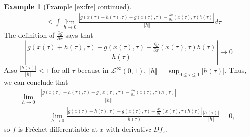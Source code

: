 \documentclass[12pt,reqno]{amsart}
\theoremstyle{definition}
\newtheorem*{example*}{Example}
\newcommand{\norm}[1]{\left\Vert {#1} \right\Vert}
\newcommand{\abs}[1]{\left\vert {#1} \right\vert}
\renewcommand{\to}{{\rightarrow}}
\begin{document}
\begin{example*}[Example \ref{ex:fre} continued]
\begin{align*}
    \;\; & \leq  \int \lim_{h \to 0} \frac{ \abs{ g(x(\tau) + h(\tau), \tau) -
        g(x(\tau),\tau) - \frac{\partial g}{\partial x}(x(\tau),\tau)
        h(\tau)} } {\norm{h}} d\tau 
  \end{align*}
  The definition of $\frac{\partial g}{\partial x}$ says that
  \[ \abs{\frac{ g(x(\tau) + h(\tau), \tau) -
      g(x(\tau),\tau) - \frac{\partial g}{\partial x}(x(\tau),\tau)
      h(\tau)}{h(\tau)}} \to 0 \]
  Also $\frac{\abs{h(\tau)}}{\norm{h}} \leq 1$ for all $\tau$ because
  in $\mathcal{L}^\infty(0,1)$, $\norm{h} = \sup_{0 \leq \tau \leq 1}
  \abs{h(\tau)}$. Thus, we can conclude that
  \begin{align*}
    \lim_{h \to 0} & \frac{ \abs{ g(x(\tau) + h(\tau), \tau) -
        g(x(\tau),\tau) - \frac{\partial g}{\partial x}(x(\tau),\tau)
        h(\tau)} } {\norm{h}}
    = \\ 
    & = \lim_{h \to 0} \frac{ \abs{ g(x(\tau) + h(\tau), \tau) -
        g(x(\tau),\tau) - \frac{\partial g}{\partial x}(x(\tau),\tau)
        h(\tau)} } {\abs{h(\tau)}} \frac{\abs{h(\tau)}} {\norm{h}}  
    = 0,
  \end{align*}
  so $f$ is Fr\'{e}chet differentiable at $x$ with derivative $Df_x$. 
\end{example*}

\end{document}
